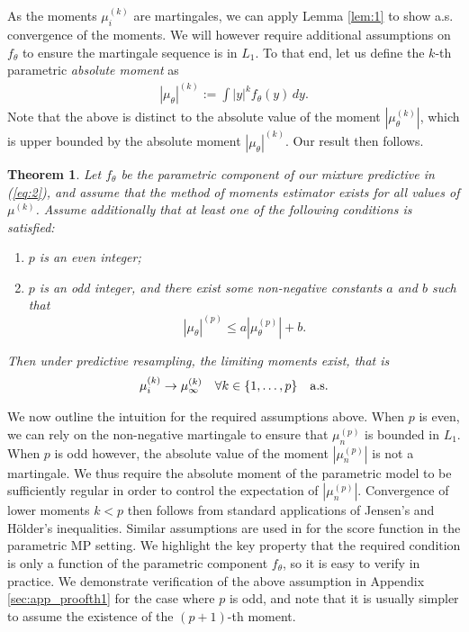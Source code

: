 \documentclass[11pt,a4paper]{article}
\theoremstyle{plain}
\newtheorem{theorem}{Theorem}
\theoremstyle{remark}
\theoremstyle{remark}
\begin{document}
 
 As the moments $\mu_i^{(k)}$ are martingales, we can apply Lemma \ref{lem:1} to show a.s. convergence of the moments. We will however require additional assumptions on $f_\theta$ to ensure the martingale sequence is in $L_1$. To that end, let us define the $k$-th parametric \textit{absolute moment} as 
 \begin{align}
     |\mu_\theta|^{(k)} := \int |y|^k f_{\theta}(y)\, dy.
 \end{align}
 Note that the above is distinct to the absolute value of the moment $|\mu_\theta^{(k)}|$, which is upper bounded by the absolute moment $|\mu_{\theta}|^{(k)}$.
 Our result then follows.
\begin{theorem}\label{thm:1} Let $f_\theta$ be the parametric component of our mixture predictive in (\ref{eq:2}), and assume that the method of moments estimator exists for all values of $\mu^{(k)}$. Assume additionally that at least one of the following conditions is satisfied:
\begin{enumerate}
    \item  $p$ is an even integer;
    \item  $p$ is an odd integer, 
    and there exist some non-negative constants $a$ and $b$ such that 
    $$|\mu_\theta|^{(p)} \leq a|\mu^{(p)}_\theta |+ b.$$
\end{enumerate}\vspace{-2mm}
Then under predictive resampling, the limiting moments exist, that is
\begin{align*}
    \mu_i^{(k)} \to \mu_\infty^{(k)} \quad \forall k \in \{1,\ldots,p\}\quad \textnormal{a.s.}
\end{align*} 
\end{theorem}


We now outline the intuition for the required assumptions above. When $p$ is even, we can rely on the non-negative martingale to ensure that $\mu_n^{(p)}$ is bounded in $L_1$. When $p$ is odd however, the absolute value of the moment $|\mu_n^{(p)}|$ is not a martingale. We thus require the absolute moment of the parametric model to be sufficiently regular in order to control the expectation of $|\mu_n^{(p)}|$. Convergence of lower moments $k < p$ then follows from standard applications of Jensen's and H\"{o}lder's inequalities. Similar assumptions are used in \cite{fong2024asymptotics} for the score function in the parametric MP setting. 
We highlight the key property that the required condition is only a function of the parametric component $f_{\theta}$, so it is easy to verify in practice. We demonstrate verification of the above assumption in Appendix \ref{sec:app_proofth1} for the case where $p$ is odd, and note that it is usually simpler to assume the existence of the $(p+1)$-th moment.
\end{document}
